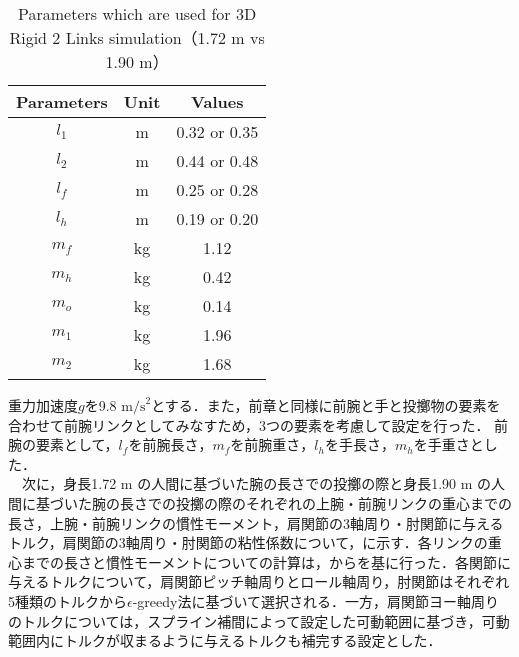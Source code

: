 \begin{table}[tb]
  \begin{center}
    \caption{Parameters which are used for 3D Rigid 2 Links simulation（1.72 m vs 1.90 m）}
    \begin{tabular}{c|c|c}
      \hline
      Parameters & Unit & Values \\
      \hline
      $l_{1}$ & m & 0.32 or 0.35 \\
      $l_{2}$ & m & 0.44 or 0.48 \\
      $l_{f}$ & m & 0.25 or 0.28 \\
      $l_{h}$ & m & 0.19 or 0.20 \\
      $m_{f}$ & kg & 1.12 \\
      $m_{h}$ & kg & 0.42 \\
      $m_{o}$ & kg & 0.14 \\
      $m_{1}$ & kg & 1.96 \\
      $m_{2}$ & kg & 1.68 \\
      \hline
    \end{tabular}
  \end{center}
\end{table}

重力加速度$g$を9.8 $\mathrm{m/s}^{2}$とする．また，前章と同様に前腕と手と投擲物の要素を合わせて前腕リンクとしてみなすため，3つの要素を考慮して設定を行った．
前腕の要素として，$l_{f}$を前腕長さ，$m_{f}$を前腕重さ，$l_{h}$を手長さ，$m_{h}$を手重さとした．\\
　次に，身長1.72 m の人間に基づいた腕の長さでの投擲の際と身長1.90 m の人間に基づいた腕の長さでの投擲の際のそれぞれの上腕・前腕リンクの重心までの長さ，上腕・前腕リンクの慣性モーメント，肩関節の3軸周り・肘関節に与えるトルク，肩関節の3軸周り・肘関節の粘性係数について，に示す．各リンクの重心までの長さと慣性モーメントについての計算は，からを基に行った．各関節に与えるトルクについて，肩関節ピッチ軸周りとロール軸周り，肘関節はそれぞれ5種類のトルクから$\epsilon$-greedy法に基づいて選択される．一方，肩関節ヨー軸周りのトルクについては，スプライン補間によって設定した可動範囲に基づき，可動範囲内にトルクが収まるように与えるトルクも補完する設定とした．

